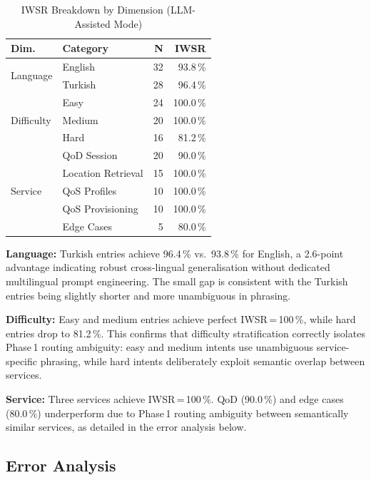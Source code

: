\documentclass[conference]{IEEEtran}
\begin{document}
\begin{table}[t]
\centering
\caption{IWSR Breakdown by Dimension (LLM-Assisted Mode)}
\label{tab:breakdown}
\small
\begin{tabular}{llrr}
\toprule
\textbf{Dim.} & \textbf{Category} & \textbf{N} & \textbf{IWSR} \\
\midrule
\multirow{2}{*}{Language}
  & English & 32 & 93.8\,\% \\
  & Turkish & 28 & 96.4\,\% \\
\midrule
\multirow{3}{*}{Difficulty}
  & Easy   & 24 & 100.0\,\% \\
  & Medium & 20 & 100.0\,\% \\
  & Hard   & 16 &  81.2\,\% \\
\midrule
\multirow{5}{*}{Service}
  & QoD Session        & 20 &  90.0\,\% \\
  & Location Retrieval & 15 & 100.0\,\% \\
  & QoS Profiles       & 10 & 100.0\,\% \\
  & QoS Provisioning   & 10 & 100.0\,\% \\
  & Edge Cases         &  5 &  80.0\,\% \\
\bottomrule
\end{tabular}
\end{table}

\textbf{Language:} Turkish entries achieve 96.4\,\% vs.\ 93.8\,\% for
English, a 2.6-point advantage indicating robust cross-lingual
generalisation without dedicated multilingual prompt engineering.
The small gap is consistent with the Turkish entries being slightly
shorter and more unambiguous in phrasing.

\textbf{Difficulty:} Easy and medium entries achieve perfect
IWSR\,=\,100\,\%, while hard entries drop to 81.2\,\%.
This confirms that difficulty stratification correctly isolates
Phase\,1 routing ambiguity: easy and medium intents use unambiguous
service-specific phrasing, while hard intents deliberately exploit
semantic overlap between services.

\textbf{Service:} Three services achieve IWSR\,=\,100\,\%.
QoD (90.0\,\%) and edge cases (80.0\,\%) underperform due to
Phase\,1 routing ambiguity between semantically similar services,
as detailed in the error analysis below.

\subsection{Error Analysis}
\end{document}
